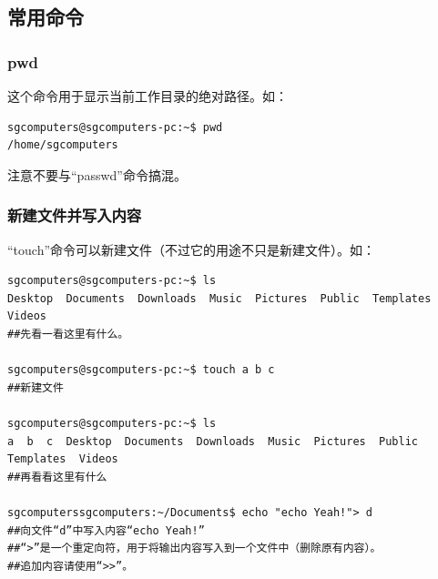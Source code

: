\documentclass{book}
\begin{document}
\subsection{常用命令}
\subsubsection{pwd}
这个命令用于显示当前工作目录的绝对路径。如：
\begin{verbatim}
sgcomputers@sgcomputers-pc:~$ pwd
/home/sgcomputers
\end{verbatim}
注意不要与“passwd”命令搞混。
\subsubsection{新建文件并写入内容}
\label{sec:nf}“touch”命令可以新建文件（不过它的用途不只是新建文件）。如：
\begin{verbatim}
sgcomputers@sgcomputers-pc:~$ ls
Desktop  Documents  Downloads  Music  Pictures  Public  Templates  Videos
##先看一看这里有什么。

sgcomputers@sgcomputers-pc:~$ touch a b c
##新建文件

sgcomputers@sgcomputers-pc:~$ ls
a  b  c  Desktop  Documents  Downloads  Music  Pictures  Public  Templates  Videos
##再看看这里有什么

sgcomputerssgcomputers:~/Documents$ echo "echo Yeah!"> d
##向文件“d”中写入内容“echo Yeah!”
##“>”是一个重定向符，用于将输出内容写入到一个文件中（删除原有内容）。
##追加内容请使用“>>”。
\end{verbatim}
\end{document}
